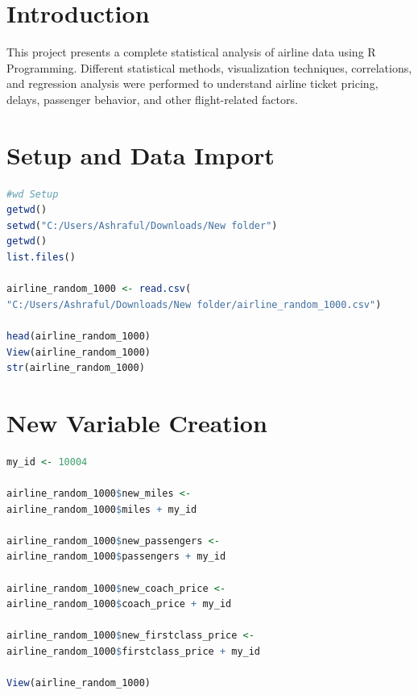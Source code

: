 \documentclass[12pt,a4paper]{article}
\begin{document}
\tableofcontents

\vspace{1cm}


\section{Introduction}

This project presents a complete statistical analysis of airline data using R Programming. Different statistical methods, visualization techniques, correlations, and regression analysis were performed to understand airline ticket pricing, delays, passenger behavior, and other flight-related factors.


\section{Setup and Data Import}

\begin{lstlisting}[language=R]
#wd Setup 
getwd()
setwd("C:/Users/Ashraful/Downloads/New folder")
getwd()
list.files()

airline_random_1000 <- read.csv(
"C:/Users/Ashraful/Downloads/New folder/airline_random_1000.csv")

head(airline_random_1000)
View(airline_random_1000)
str(airline_random_1000)
\end{lstlisting}


\section{New Variable Creation}

\begin{lstlisting}[language=R]
my_id <- 10004

airline_random_1000$new_miles <- 
airline_random_1000$miles + my_id

airline_random_1000$new_passengers <- 
airline_random_1000$passengers + my_id

airline_random_1000$new_coach_price <- 
airline_random_1000$coach_price + my_id

airline_random_1000$new_firstclass_price <- 
airline_random_1000$firstclass_price + my_id

View(airline_random_1000)
\end{lstlisting}
\end{document}
